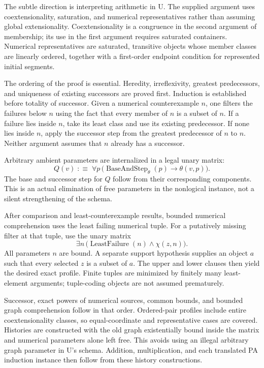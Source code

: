 \documentclass[11pt,a4paper]{article}
\begin{document}
The subtle direction is interpreting arithmetic in U. The supplied argument
uses coextensionality, saturation, and numerical representatives rather
than assuming global extensionality. Coextensionality is a congruence in
the second argument of membership; its use in the first argument requires
saturated containers. Numerical representatives are saturated, transitive
objects whose member classes are linearly ordered, together with a first-order
endpoint condition for represented initial segments.

The ordering of the proof is essential. Heredity, irreflexivity, greatest
predecessors, and uniqueness of existing successors are proved first.
Induction is established before totality of successor. Given a numerical
counterexample $n$, one filters the failures below $n$ using the fact that
every member of $n$ is a subset of $n$. If a failure lies inside $n$, take
its least class and use its existing predecessor. If none lies inside $n$,
apply the successor step from the greatest predecessor of $n$ to $n$.
Neither argument assumes that $n$ already has a successor.

Arbitrary ambient parameters are internalized in a legal unary matrix:
\[
Q(v)\;:\!\equiv\;\forall p\,
\bigl(\operatorname{BaseAndStep}_{\theta}(p)\to\theta(v,p)\bigr).
\]
The base and successor step for $Q$ follow from their corresponding
components. This is an actual elimination of free parameters in the
nonlogical instance, not a silent strengthening of the schema.

After comparison and least-counterexample results, bounded numerical
comprehension uses the least failing numerical tuple. For a putatively
missing filter at that tuple, use the unary matrix
\[
\exists n\,
  \bigl(\operatorname{LeastFailure}(n)\land\chi(z,n)\bigr).
\]
All parameters $n$ are bound. A separate support hypothesis supplies an
object $a$ such that every selected $z$ is a subset of $a$. The upper and
lower clauses then yield the desired exact profile. Finite tuples are
minimized by finitely many least-element arguments; tuple-coding objects
are not assumed prematurely.

Successor, exact powers of numerical sources, common bounds, and bounded
graph comprehension follow in that order. Ordered-pair profiles include
entire coextensionality classes, so equal-coordinate and representative
cases are covered. Histories are constructed with the old graph
existentially bound inside the matrix and numerical parameters alone left
free. This avoids using an illegal arbitrary graph parameter in U's schema.
Addition, multiplication, and each translated PA induction instance then
follow from these history constructions.
\end{document}
